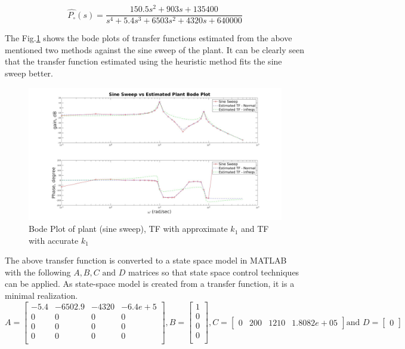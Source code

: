 \documentclass[11pt,usenames]{article}
\begin{document}
\begin{equation} 
\hat{P_{\circ}}(s)=\dfrac{150.5s^{2}+903s+135400}{s^{4}+5.4s^{3}+6503s^{2}+4320s+640000}
\label{eq:Gheu}
\end{equation}

The Fig.\ref{fig:SineSweepVsEstimatedTFs} shows the bode plots of transfer functions estimated from the above mentioned two methods against the sine sweep of the plant. It can be clearly seen that the transfer function estimated using the heuristic method fits the sine sweep better.

\begin{figure}[htpb]
	\centering
	\includegraphics[width=1\columnwidth]{SineSweepVsEstimatedTFs.jpg}
	\caption{ Bode Plot of plant (sine sweep), TF with approximate $k_{1}$ and TF with accurate $k_{1}$ }
	\label{fig:SineSweepVsEstimatedTFs}
\end{figure}

The above transfer function is converted to a state space model in MATLAB with the following $ A, B, C \text{ and } D$ matrices so that state space control techniques can be applied. As state-space model is created from a transfer function, it is a minimal realization.
$$
A = 
\begin{bmatrix} 
	-5.4 & -6502.9 & -4320 & -6.4e+5\\
	0 & 0 & 0 & 0\\
	0 & 0 & 0 & 0\\
	0 & 0 & 0 & 0\\
\end{bmatrix}
,B = 
\begin{bmatrix} 
1 \\
0 \\
0 \\
0 \\ 
\end{bmatrix}
,C = 
\begin{bmatrix} 
0 & 200 & 1210 & 1.8082e+05
\end{bmatrix}
\text{and } D = 
\begin{bmatrix} 
0
\end{bmatrix}
$$
\end{document}
